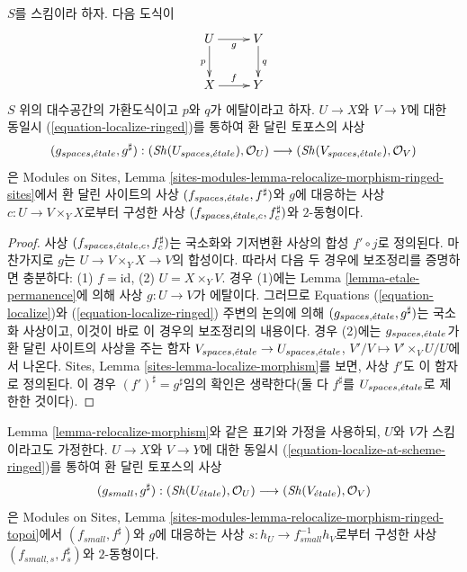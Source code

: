 \begin{lemma}
\label{lemma-relocalize-morphism}
$S$를 스킴이라 하자. 다음 도식이
$$
\xymatrix{
U \ar[d]_p \ar[r]_g & V \ar[d]^q \\
X \ar[r]^f & Y
}
$$
$S$ 위의 대수공간의 가환도식이고 $p$와 $q$가 에탈이라고 하자.
$U \to X$와 $V \to Y$에 대한 동일시
(\ref{equation-localize-ringed})를 통하여 환 달린 토포스의 사상
$$
(g_{spaces, {\acute{e}tale}}, g^\sharp) :
(\mathop{\mathit{Sh}}\nolimits(U_{spaces, {\acute{e}tale}}), \mathcal{O}_U)
\longrightarrow
(\mathop{\mathit{Sh}}\nolimits(V_{spaces, {\acute{e}tale}}), \mathcal{O}_V)
$$
은 Modules on Sites, Lemma
\ref{sites-modules-lemma-relocalize-morphism-ringed-sites}에서 환 달린
사이트의 사상 $(f_{spaces, {\acute{e}tale}}, f^\sharp)$와 $g$에 대응하는 사상
$c : U \to V \times_Y X$로부터 구성한 사상
$(f_{spaces, {\acute{e}tale}, c}, f_c^\sharp)$와 $2$-동형이다.
\end{lemma}

\begin{proof}
사상 $(f_{spaces, {\acute{e}tale}, c}, f_c^\sharp)$는 국소화와 기저변환 사상의
합성 $f' \circ j$로 정의된다. 마찬가지로 $g$는
$U \to V \times_Y X \to V$의 합성이다. 따라서 다음 두 경우에
보조정리를 증명하면 충분하다: (1) $f = \text{id}$, (2)
$U = X \times_Y V$. 경우 (1)에는 Lemma
\ref{lemma-etale-permanence}에 의해 사상 $g : U \to V$가 에탈이다.
그러므로 Equations (\ref{equation-localize})와
(\ref{equation-localize-ringed}) 주변의 논의에 의해
$(g_{spaces, {\acute{e}tale}}, g^\sharp)$는 국소화 사상이고, 이것이 바로 이
경우의 보조정리의 내용이다. 경우 (2)에는 $g_{spaces, {\acute{e}tale}}$가
환 달린 사이트의 사상을 주는 함자
$V_{spaces, {\acute{e}tale}} \to U_{spaces, {\acute{e}tale}}$,
$V'/V \mapsto V' \times_V U/U$에서 나온다. Sites, Lemma
\ref{sites-lemma-localize-morphism}를 보면, 사상 $f'$도 이 함자로 정의된다.
이 경우 $(f')^\sharp = g^\sharp$임의 확인은 생략한다(둘 다
$f^\sharp$를 $U_{spaces, {\acute{e}tale}}$로 제한한 것이다).
\end{proof}

\begin{lemma}
\label{lemma-relocalize-morphism-at-schemes}
Lemma \ref{lemma-relocalize-morphism}와 같은 표기와 가정을 사용하되,
$U$와 $V$가 스킴이라고도 가정한다. $U \to X$와 $V \to Y$에 대한
동일시 (\ref{equation-localize-at-scheme-ringed})를 통하여 환 달린
토포스의 사상
$$
(g_{small}, g^\sharp) :
(\mathop{\mathit{Sh}}\nolimits(U_{\acute{e}tale}), \mathcal{O}_U)
\longrightarrow
(\mathop{\mathit{Sh}}\nolimits(V_{\acute{e}tale}), \mathcal{O}_V)
$$
은 Modules on Sites, Lemma
\ref{sites-modules-lemma-relocalize-morphism-ringed-topoi}에서
$(f_{small}, f^\sharp)$와 $g$에 대응하는 사상
$s : h_U \to f_{small}^{-1}h_V$로부터 구성한 사상
$(f_{small, s}, f_s^\sharp)$와 $2$-동형이다.
\end{lemma}

